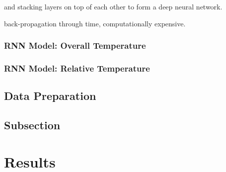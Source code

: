 \documentclass[]{article}
\begin{document}
and stacking layers on top of each other to form a deep neural network. 

back-propagation through time, computationally expensive.

\subsubsection{RNN Model: Overall Temperature} \label{sec:rnn-model-overall}

\subsubsection{RNN Model: Relative Temperature} \label{sec:rnn-model-relative}

\subsection{Data Preparation} \label{sec:data-prep}



\subsection{Subsection} \label{sec:subsection-name}












\section{Results} \label{sec:results}
\end{document}

